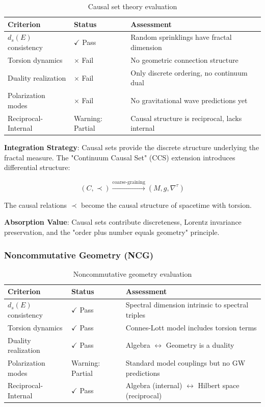 \begin{table}[h]
\centering
\begin{tabular}{p{3.5cm}p{2cm}p{6cm}}
\toprule
\textbf{Criterion} & \textbf{Status} & \textbf{Assessment} \\
\midrule
$d_s(E)$ consistency & $\checkmark$ Pass & Random sprinklings have fractal dimension \\
Torsion dynamics & $\times$ Fail & No geometric connection structure \\
Duality realization & $\times$ Fail & Only discrete ordering, no continuum dual \\
Polarization modes & $\times$ Fail & No gravitational wave predictions yet \\
Reciprocal-Internal & Warning: Partial & Causal structure is reciprocal, lacks internal \\
\bottomrule
\end{tabular}
\caption{Causal set theory evaluation}
\end{table}

\textbf{Integration Strategy}:
Causal sets provide the discrete structure underlying the fractal measure. The "Continuum Causal Set" (CCS) extension introduces differential structure:

\begin{equation}
    (C, \prec) \xrightarrow{\text{coarse-graining}} (M, g, \nabla^\tau)
\end{equation}

The causal relations $\prec$ become the causal structure of spacetime with torsion.

\textbf{Absorption Value}: Causal sets contribute discreteness, Lorentz invariance preservation, and the "order plus number equals geometry" principle.

\subsubsection{Noncommutative Geometry (NCG)}

\begin{table}[h]
\centering
\begin{tabular}{p{3.5cm}p{2cm}p{6cm}}
\toprule
\textbf{Criterion} & \textbf{Status} & \textbf{Assessment} \\
\midrule
$d_s(E)$ consistency & $\checkmark$ Pass & Spectral dimension intrinsic to spectral triples \\
Torsion dynamics & $\checkmark$ Pass & Connes-Lott model includes torsion terms \\
Duality realization & $\checkmark$ Pass & Algebra $\leftrightarrow$ Geometry is a duality \\
Polarization modes & Warning: Partial & Standard model couplings but no GW predictions \\
Reciprocal-Internal & $\checkmark$ Pass & Algebra (internal) $\leftrightarrow$ Hilbert space (reciprocal) \\
\bottomrule
\end{tabular}
\caption{Noncommutative geometry evaluation}
\end{table}


